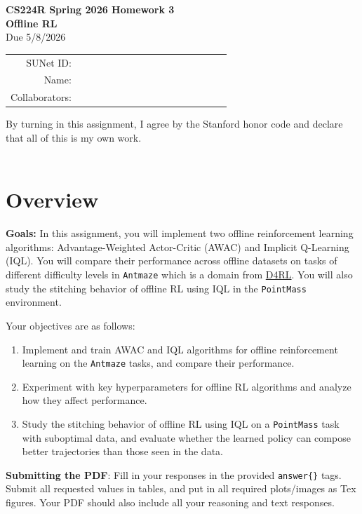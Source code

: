 \documentclass[12pt]{article}
\begin{document}
\begin{center}
{\Large \textbf{CS224R Spring 2026 Homework 3 \\ Offline RL}}
\\ {\large Due 5/8/2026}

\begin{tabular}{rl}
SUNet ID: & $\hspace{6cm}$\\
Name: & \\
Collaborators: & 
\end{tabular}
\end{center}

\noindent By turning in this assignment, I agree by the Stanford honor code and declare
that all of this is my own work. \\
\\

\section*{Overview}

\textbf{Goals:} In this assignment, you will implement two offline reinforcement learning algorithms: Advantage-Weighted Actor-Critic (AWAC) and Implicit Q-Learning (IQL). You will compare their performance across offline datasets on tasks of different difficulty levels in \texttt{Antmaze} which is a domain from \href{https://arxiv.org/abs/2004.07219}{D4RL}. You will also study the stitching behavior of offline RL using IQL in the \texttt{PointMass} environment.

\noindent Your objectives are as follows:

\begin{enumerate} 
    \item Implement and train AWAC and IQL algorithms for offline reinforcement learning on the \texttt{Antmaze} tasks, and compare their performance.
    \item Experiment with key hyperparameters for offline RL algorithms and analyze how they affect performance.
    \item Study the stitching behavior of offline RL using IQL on a \texttt{PointMass} task with suboptimal data, and evaluate whether the learned policy can compose better trajectories than those seen in the data.
\end{enumerate}

\vspace{0.2cm}
\noindent\textbf{Submitting the PDF}: Fill in your responses in the provided \texttt{answer\{\}} tags. Submit all requested values in tables, and put in all required plots/images as Tex figures. Your PDF should also include all your reasoning and text responses.
\end{document}
